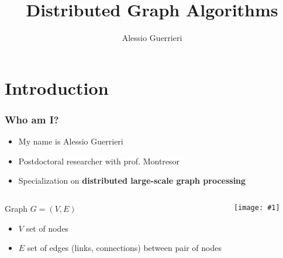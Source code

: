 

\usepackage{comment}
\usepackage{listings}


\newcommand{\Mapper}{\textsf{Mapper}\xspace}
\newcommand{\Reducer}{\textsf{Reducer}\xspace}
\newcommand{\Key}{\textit{key}\xspace}
\newcommand{\Values}{\textit{values}\xspace}

\author{Alessio Guerrieri}
\title[DS - Graphs]{\textbf{Distributed Graph Algorithms}}

\graphicspath{{figs/12/}}

\newcommand\Slide[2]{\begin{frame} \frametitle{#1} #2 \end{frame}}
\newcommand\SlideF[2]{\begin{frame} \frametitle{#1} #2 \end{frame}}
\newcommand\Block[2]{\begin{block}{#1} #2 \end{block}}
\newcommand\DueColonne[4]{\begin{columns}\column{#1\textwidth} #3 \column{#2\textwidth} #4 \end{columns}}
\newcommand\TreColonne[6]{\begin{columns}\column{#1\textwidth} #4 \column{#2\textwidth} #5  \column{#3\textwidth} #6 \end{columns}}
\newcommand\Image[1]{\texttt{[image: \#1]}}
\newcommand\ImageI[2]{\begin{center}\texttt{[image: \#1]}\end{center}}
\newcommand\Lista[1]{\begin{itemize} #1 \end{itemize}}
\newcommand\BlockLista[2]{\Block{#1}{\Lista{#2}}}






\FrameTitle{}

\FrameContent

\section{Introduction}
\Slide{Who am I?}
{
    \Lista{
        \item My name is Alessio Guerrieri
        \item Postdoctoral researcher with prof. Montresor
        \item Specialization on \textbf{distributed large-scale graph processing}
    }
    \DueColonne{.6}{.4}
    {
        \BlockLista{Graph $G=(V,E)$}
        {
            \item $V$ set of nodes
            \item $E$ set of edges (links, connections) between pair of nodes
        }    
    }{
        \Image{graph}
    }
    
}

